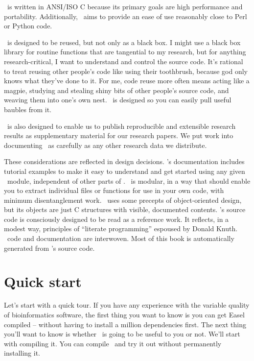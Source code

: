 \Easel\ is written in ANSI/ISO C because its primary goals are high
performance and portability. Additionally, \Easel\ aims to provide an
ease of use reasonably close to Perl or Python code.

\Easel\ is designed to be reused, but not only as a black box. I might
use a black box library for routine functions that are tangential to
my research, but for anything research-critical, I want to understand
and control the source code.  It's rational to treat reusing other
people's code like using their toothbrush, because god only knows what
they've done to it. For me, code reuse more often means acting like a
magpie, studying and stealing shiny bits of other people's source
code, and weaving them into one's own nest. \Easel\ is designed so you
can easily pull useful baubles from it.

\Easel\ is also designed to enable us to publish reproducible and
extensible research results as supplementary material for our research
papers. We put work into documenting \Easel\ as carefully as any other
research data we distribute.

These considerations are reflected in \Easel design decisions.
\Easel's documentation includes tutorial examples to make it easy to
understand and get started using any given \Easel\ module, independent
of other parts of \Easel.  \Easel\ is modular, in a way that should
enable you to extract individual files or functions for use in your
own code, with minimum disentanglement work. \Easel\ uses some
precepts of object-oriented design, but its objects are just C
structures with visible, documented contents. \Easel's source code is
consciously designed to be read as a reference work. It reflects, in a
modest way, principles of ``literate programming'' espoused by Donald
Knuth. \Easel\ code and documentation are interwoven. Most of this
book is automatically generated from \Easel's source code.



\section{Quick start}

Let's start with a quick tour. If you have any experience with the
variable quality of bioinformatics software, the first thing you want
to know is you can get Easel compiled -- without having to install a
million dependencies first. The next thing you'll want to know is
whether \Easel\ is going to be useful to you or not. We'll start with
compiling it. You can compile \Easel\ and try it out without
permanently installing it.



